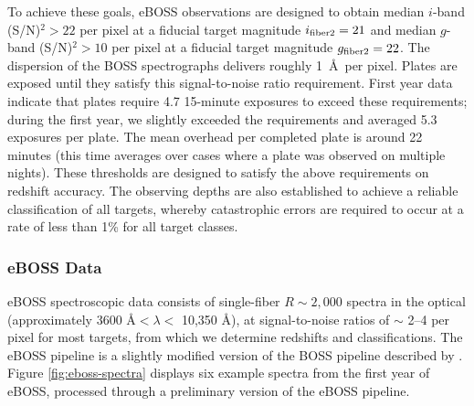 To achieve these goals, eBOSS observations are designed to obtain
median $i$-band (S/N)$^2>22$ per pixel at a fiducial target magnitude
$i_{\rm fiber2}=21$ and median $g$-band (S/N)$^2>10$ per pixel at a
fiducial target magnitude $g_{\rm fiber2}=22$.  The dispersion of the
BOSS spectrographs delivers roughly 1~\AA\ per pixel.  Plates are
exposed until they satisfy this signal-to-noise ratio requirement.
First year data indicate that plates require 4.7 15-minute exposures
to exceed these requirements; during the first year, we slightly
exceeded the requirements and averaged 5.3 exposures per plate. The
mean overhead per completed plate is around 22 minutes (this time
averages over cases where a plate was observed on multiple nights).
These thresholds are designed to satisfy the above requirements on
redshift accuracy.  The observing depths are also established to
achieve a reliable classification of all targets, whereby catastrophic
errors are required to occur at a rate of less than 1\% for all target
classes.


\subsubsection{eBOSS Data}
\label{sec:eboss:data}

eBOSS spectroscopic data consists of single-fiber $R\sim 2,000$
spectra in the optical (approximately 3600 \AA $< \lambda <$
10,350 \AA), at signal-to-noise ratios of $\sim$ 2--4 per pixel for
most targets, from which we determine redshifts and
classifications. The eBOSS pipeline is a slightly modified version of
the BOSS pipeline described by \citet{bolton12a}.
Figure \ref{fig:eboss-spectra} displays six example spectra from the
first year of eBOSS, processed through a preliminary version of the
eBOSS pipeline.


